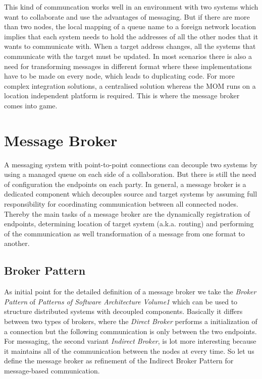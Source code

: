 This kind of communcation works well in an environment with two systems which
want to collaborate and use the advantages of messaging. But if there are more
than two nodes, the local mapping of a queue name to a foreign network location
implies that each system needs to hold the addresses of all the other nodes that it
wants to communicate with. When a target address changes, all the systems that
communicate with the target must be updated. In most scenarios there is also a need
for transforming messages in different format where these implementations have
to be made on every node, which leads to duplicating code.  For more complex
integration solutions, a centralised solution whereas the MOM runs on a location
independent platform is required. This is where the message broker comes into
game. \cite{MSDNIntegration}

\section{Message Broker}
\label{intro-messaging-broker}
A messaging system with point-to-point connections can decouple two systems
by using a managed queue on each side of a collaboration. But there is
still the need of configuration the endpoints on each party. In general, a
message broker is a dedicated component which decouples source and
target systems by assuming full responsibility for coordinating communication between
all connected nodes. Thereby the main tasks of a message broker are the
dynamically registration of endpoints, determining location of target system
(a.k.a. routing) and performing of the communication as well transformation of a
message from one format to another.\cite{MSDNIntegration} \\

\subsection{Broker Pattern}
As initial point for the detailed definition of a message broker we take the
\textit{Broker Pattern} of  \textit{Patterns of Software Architecture Volume1}
which can be used to structure distributed systems with decoupled components.
Basically it differs between two types of brokers, where the \textit{Direct
Broker} performs a initialization of a connection but the following communication
is only between the two endpoints. For messaging, the second variant
\textit{Indirect Broker}, is lot more interesting because it maintains all of
the communication between the nodes at every time. So let us define the message
broker as refinement of the Indirect Broker Pattern for message-based
communication.\cite{POSA1} 

